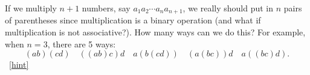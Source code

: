 \documentclass{book}
\begin{document}
\setcounter{project}{175}
\addtocounter{project}{-1}
\begin{activity}[]\label{act-parenthesize}
\hypertarget{p-1039}{}%
If we multiply \(n+1\) numbers, say \(a_1a_2\cdots a_n a_{n+1}\), we really should put in \(n\) pairs of parentheses since multiplication is a binary operation (and what if multiplication is not associative?).  How many ways can we do this?  For example, when \(n = 3\), there are 5 ways:%
\begin{equation*}
(ab)(cd)\quad ((ab)c)d \quad a(b(cd)) \quad (a(bc))d \quad a((bc)d).
\end{equation*}
%
~\hfill{\tiny\hyperlink{a-175}{[hint]}\hypertarget{q-175}{}}\end{activity}
\end{document}
